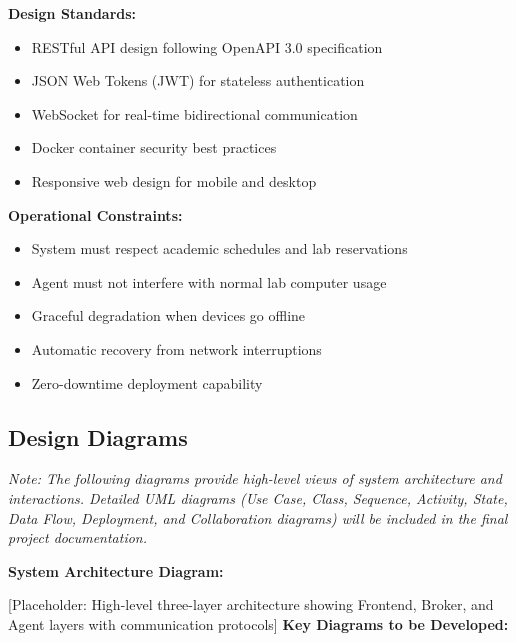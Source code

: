 \documentclass[12pt,a4paper]{article}
\begin{document}
\textbf{Design Standards:}

\begin{itemize}
    \item RESTful API design following OpenAPI 3.0 specification
    \item JSON Web Tokens (JWT) for stateless authentication
    \item WebSocket for real-time bidirectional communication
    \item Docker container security best practices
    \item Responsive web design for mobile and desktop
\end{itemize}

\textbf{Operational Constraints:}

\begin{itemize}
    \item System must respect academic schedules and lab reservations
    \item Agent must not interfere with normal lab computer usage
    \item Graceful degradation when devices go offline
    \item Automatic recovery from network interruptions
    \item Zero-downtime deployment capability
\end{itemize}

\subsection{Design Diagrams}
\label{sec:diagrams}

\textit{Note: The following diagrams provide high-level views of system architecture and interactions. Detailed UML diagrams (Use Case, Class, Sequence, Activity, State, Data Flow, Deployment, and Collaboration diagrams) will be included in the final project documentation.}

\textbf{System Architecture Diagram:}

[Placeholder: High-level three-layer architecture showing Frontend, Broker, and Agent layers with communication protocols]
\textbf{Key Diagrams to be Developed:}
\end{document}
